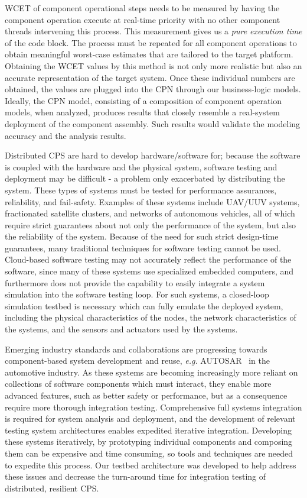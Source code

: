 WCET of component operational steps needs to be measured by having the component operation execute at real-time priority with no other component threads intervening this process. This measurement gives us a \emph{pure execution time} of the code block. The process must be repeated for all component operations to obtain meaningful worst-case estimates that are tailored to the target platform. Obtaining the WCET values by this method is not only more realistic but also an accurate representation of the target system. Once these individual numbers are obtained, the values are plugged into the CPN through our business-logic models. Ideally, the CPN model, consisting of a composition of component operation models, when analyzed, produces results that closely resemble a real-system deployment of the component assembly. Such results would validate the modeling accuracy and the analysis results.

Distributed CPS are hard to develop hardware/software for; because the software is coupled with the hardware and the physical system, software testing and deployment may be difficult - a problem only exacerbated by distributing the system.  These types of systems must be tested for performance assurances, reliability, and fail-safety.  Examples of these systems include UAV/UUV systems, fractionated satellite clusters, and networks of autonomous vehicles, all of which require strict guarantees about not only the performance of the system, but also the reliability of the system.  Because of the need for such strict design-time guarantees, many traditional techniques for software testing cannot be used.  Cloud-based software testing may not accurately reflect the performance of the software, since many of these systems use specialized embedded computers, and furthermore does not provide the capability to easily integrate a system simulation into the software testing loop.  For such systems, a closed-loop simulation testbed is necessary which can fully emulate the deployed system, including the physical characteristics of the nodes, the network characteristics of the systems, and the sensors and actuators used by the systems.

Emerging industry standards and collaborations are progressing towards component-based system development and reuse, \emph{e.g.} AUTOSAR~\cite{autosar} in the automotive industry.  As these systems are becoming increasingly more reliant on collections of software components which must interact, they enable more advanced features, such as better safety or performance, but as a consequence require more thorough integration testing.  Comprehensive full systems integration is required for system analysis and deployment, and the development of relevant testing system architectures enables expedited iterative integration.  Developing these systems iteratively, by prototyping individual components and composing them can be expensive and time consuming, so tools and techniques are needed to expedite this process.  Our testbed architecture was developed to help address these issues and decrease the turn-around time for integration testing of distributed, resilient CPS.  

